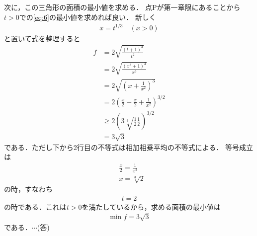 \documentclass[a4paper,10pt]{ltjsarticle}
\begin{document}
\begin{multicols}{2}
  \vspace{10pt}
  次に，この三角形の面積の最小値を求める．
  点Pが第一章限にあることから$t>0$での\cref{eq:6}の最小値を求めれば良い．
  新しく
  \begin{align*}
    x = t^{1/3} \quad (x>0)
  \end{align*}
  と置いて式を整理すると
  \begin{align*}
    f
     & = 2\sqrt{\frac{(t+1)^3}{t^2}}                                 \\
     & = 2\sqrt{\frac{(x^3+1)^3}{x^6}}                               \\
     & = 2\sqrt{\left(x + \frac{1}{x^2}\right)^3}                    \\
     & = 2\left(\frac{x}{2}+\frac{x}{2} + \frac{1}{x^2}\right)^{3/2} \\
     & \ge 2 \left(3\sqrt[3]{\frac{1}{2}\frac{1}{2}}\right)^{3/2}    \\
     & = 3\sqrt{3}
  \end{align*}
  である．ただし下から2行目の不等式は相加相乗平均の不等式による．
  等号成立は
  \begin{align*}
     & \frac{x}{2} =  \frac{1}{x^2} \\
     & x =\sqrt[3]{2}
  \end{align*}
  の時，すなわち
  \begin{align*}
    t = 2
  \end{align*}
  の時である．これは$t>0$を満たしているから，求める面積の最小値は
  \begin{align*}
    \min f = 3\sqrt{3}
  \end{align*}
  である．$\cdots$(答)

  \newpage
\end{multicols}
\end{document}
